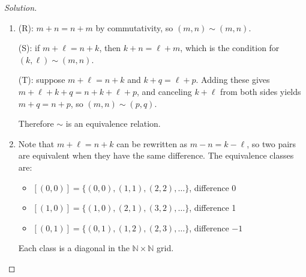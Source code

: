 \documentclass[12pt]{article}
\newcommand{\NN}{\ensuremath{\mathbb N}}
\begin{document}
\begin{proof}[Solution]
~
\begin{enumerate}[label=(\alph*)]
    \item (R): $m + n = n + m$ by commutativity, so $(m,n) \sim (m,n)$.

    (S): if $m + \ell = n + k$, then $k + n = \ell + m$, which is the condition for $(k,\ell) \sim (m,n)$.

    (T): suppose $m + \ell = n + k$ and $k + q = \ell + p$. Adding these gives $m + \ell + k + q = n + k + \ell + p$, and canceling $k + \ell$ from both sides yields $m + q = n + p$, so $(m,n) \sim (p,q)$.

    Therefore $\sim$ is an equivalence relation.

    \vspace{0.3in}

    \item Note that $m + \ell = n + k$ can be rewritten as $m - n = k - \ell$, so two pairs are equivalent when they have the same difference. The equivalence classes are:
    \begin{itemize}
        \item $[(0,0)] = \{(0,0),(1,1),(2,2),\ldots\}$, difference 0
        \item $[(1,0)] = \{(1,0),(2,1),(3,2),\ldots\}$, difference 1
        \item $[(0,1)] = \{(0,1),(1,2),(2,3),\ldots\}$, difference $-1$
    \end{itemize}

    Each class is a diagonal in the $\NN \times \NN$ grid.

    \begin{center}
    \end{center}
\end{enumerate}
\end{proof}
\end{document}
